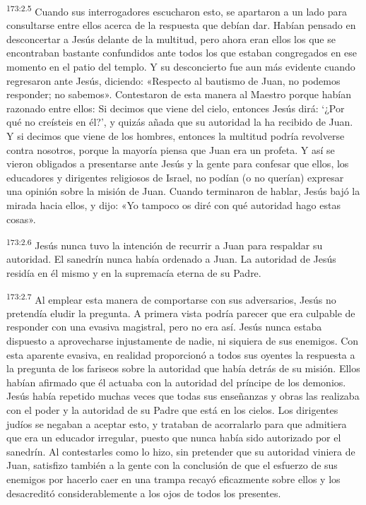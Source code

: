 \par 
\textsuperscript{173:2.5} Cuando sus interrogadores escucharon esto, se apartaron a un lado para consultarse entre ellos acerca de la respuesta que debían dar. Habían pensado en desconcertar a Jesús delante de la multitud, pero ahora eran ellos los que se encontraban bastante confundidos ante todos los que estaban congregados en ese momento en el patio del templo. Y su desconcierto fue aun más evidente cuando regresaron ante Jesús, diciendo: «Respecto al bautismo de Juan, no podemos responder; no sabemos». Contestaron de esta manera al Maestro porque habían razonado entre ellos: Si decimos que viene del cielo, entonces Jesús dirá: `¿Por qué no creísteis en él?', y quizás añada que su autoridad la ha recibido de Juan. Y si decimos que viene de los hombres, entonces la multitud podría revolverse contra nosotros, porque la mayoría piensa que Juan era un profeta. Y así se vieron obligados a presentarse ante Jesús y la gente para confesar que ellos, los educadores y dirigentes religiosos de Israel, no podían (o no querían) expresar una opinión sobre la misión de Juan. Cuando terminaron de hablar, Jesús bajó la mirada hacia ellos, y dijo: «Yo tampoco os diré con qué autoridad hago estas cosas».

\par 
\textsuperscript{173:2.6} Jesús nunca tuvo la intención de recurrir a Juan para respaldar su autoridad. El sanedrín nunca había ordenado a Juan. La autoridad de Jesús residía en él mismo y en la supremacía eterna de su Padre.

\par 
\textsuperscript{173:2.7} Al emplear esta manera de comportarse con sus adversarios, Jesús no pretendía eludir la pregunta. A primera vista podría parecer que era culpable de responder con una evasiva magistral, pero no era así. Jesús nunca estaba dispuesto a aprovecharse injustamente de nadie, ni siquiera de sus enemigos. Con esta aparente evasiva, en realidad proporcionó a todos sus oyentes la respuesta a la pregunta de los fariseos sobre la autoridad que había detrás de su misión. Ellos habían afirmado que él actuaba con la autoridad del príncipe de los demonios. Jesús había repetido muchas veces que todas sus enseñanzas y obras las realizaba con el poder y la autoridad de su Padre que está en los cielos. Los dirigentes judíos se negaban a aceptar esto, y trataban de acorralarlo para que admitiera que era un educador irregular, puesto que nunca había sido autorizado por el sanedrín. Al contestarles como lo hizo, sin pretender que su autoridad viniera de Juan, satisfizo también a la gente con la conclusión de que el esfuerzo de sus enemigos por hacerlo caer en una trampa recayó eficazmente sobre ellos y los desacreditó considerablemente a los ojos de todos los presentes.

